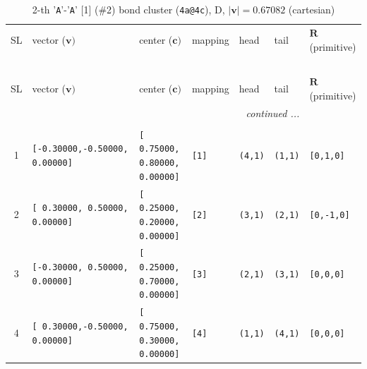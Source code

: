 \documentclass[fleqn,10pt,landscape]{jsarticle}
\begin{document}
\begin{longtable}[l]{cllllll}
\captionsetup{justification=raggedright, singlelinecheck=off}
\caption{2-th '\texttt{A}'-'\texttt{A}' [1] (\#2) bond cluster (\texttt{4a@4c}), D, $|\bm{v}|=0.67082$ (cartesian)}
 \\
 \hline \hline
SL & vector ($\bm{v})$ & center ($\bm{c})$ & mapping & head & tail & $\bm{R}$ (primitive) \\ \hline \endfirsthead

\multicolumn{6}{l}{\tablename\ \thetable{}} \\
 \hline \hline
SL & vector ($\bm{v})$ & center ($\bm{c})$ & mapping & head & tail & $\bm{R}$ (primitive) \\ \hline \endhead

 \hline \hline
\multicolumn{6}{r}{\footnotesize\it continued ...} \\ \endfoot

 \hline \hline
\multicolumn{6}{r}{} \\ \endlastfoot

1 & \texttt{[-0.30000,-0.50000, 0.00000]} & \texttt{[ 0.75000, 0.80000, 0.00000]} & \texttt{[1]} & \texttt{(4,1)} & \texttt{(1,1)} & \texttt{[0,1,0]} \\ \hline
2 & \texttt{[ 0.30000, 0.50000, 0.00000]} & \texttt{[ 0.25000, 0.20000, 0.00000]} & \texttt{[2]} & \texttt{(3,1)} & \texttt{(2,1)} & \texttt{[0,-1,0]} \\ \hline
3 & \texttt{[-0.30000, 0.50000, 0.00000]} & \texttt{[ 0.25000, 0.70000, 0.00000]} & \texttt{[3]} & \texttt{(2,1)} & \texttt{(3,1)} & \texttt{[0,0,0]} \\ \hline
4 & \texttt{[ 0.30000,-0.50000, 0.00000]} & \texttt{[ 0.75000, 0.30000, 0.00000]} & \texttt{[4]} & \texttt{(1,1)} & \texttt{(4,1)} & \texttt{[0,0,0]} \\
\end{longtable}
\renewcommand{\arraystretch}{1.6}
\end{document}
